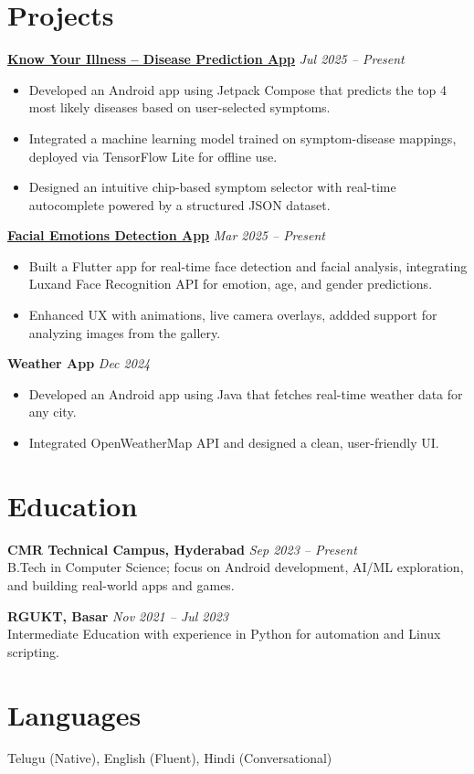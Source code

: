 \documentclass[a4paper,10pt]{article}
\begin{document}
\section*{Projects}

\textbf{\href{https://github.com/anileshwar12/KnowYourIllness}{Know Your Illness – Disease Prediction App}} \hfill \textit{Jul 2025 – Present}
 \\
\begin{itemize}[leftmargin=*, itemsep=1pt]
    \item Developed an Android app using Jetpack Compose that predicts the top 4 most likely diseases based on user-selected symptoms.
    \item Integrated a machine learning model trained on symptom-disease mappings, deployed via TensorFlow Lite for offline use.
    \item Designed an intuitive chip-based symptom selector with real-time autocomplete powered by a structured JSON dataset.
\end{itemize}

\textbf{\href{https://github.com/anileshwar12/faceapp}{Facial Emotions Detection App}} \hfill \textit{Mar 2025 – Present}
 \\
\begin{itemize}[leftmargin=*, itemsep=1pt]
    \item Built a Flutter app for real-time face detection and facial analysis, integrating Luxand Face Recognition API for emotion, age, and gender predictions.
    \item Enhanced UX with animations, live camera overlays, addded support for analyzing images from the gallery.
\end{itemize}




\textbf{Weather App} \hfill \textit{Dec 2024} \\
\begin{itemize}[leftmargin=*, itemsep=1pt]
    \item Developed an Android app using Java that fetches real-time weather data for any city.
    \item Integrated OpenWeatherMap API and designed a clean, user-friendly UI.
\end{itemize}


\section*{Education}

\textbf{CMR Technical Campus, Hyderabad} \hfill \textit{Sep 2023 – Present} \\
B.Tech in Computer Science; focus on Android development, AI/ML exploration, and building real-world apps and games.

\textbf{RGUKT, Basar} \hfill \textit{Nov 2021 – Jul 2023} \\
Intermediate Education with experience in Python for automation and Linux scripting.



\section*{Languages}

Telugu (Native), English (Fluent), Hindi (Conversational)
\end{document}
